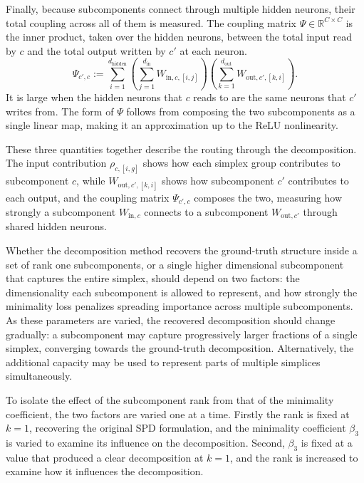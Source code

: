 \documentclass{article}
\begin{document}
Finally, because subcomponents connect through multiple hidden neurons,
their total coupling across all of them is measured. The coupling matrix
$\Psi \in \mathbb{R}^{C \times C}$ is the inner product, taken over the hidden
neurons, between the total input read by $c$ and the total output written by
$c'$ at each neuron.
\begin{equation}
    \Psi_{c',c} := \sum_{i=1}^{d_{\text{hidden}}}
    \left( \sum_{j=1}^{d_{\text{in}}}  W_{\text{in},c,[i,j]}  \right)
    \left( \sum_{k=1}^{d_{\text{out}}} W_{\text{out},c',[k,i]} \right).
\end{equation}
It is large when the hidden neurons that $c$ reads to are the same
neurons that $c'$ writes from. The form of $\Psi$ follows from composing the
two subcomponents as a single linear map, making it an approximation up to the ReLU nonlinearity.

These three quantities together describe the routing through the decomposition. The input
contribution $\rho_{c,[i,g]}$ shows how each simplex group contributes to subcomponent $c$,
while $W_{\text{out},c',[k,i]}$ shows how subcomponent $c'$ contributes to each output,
and the coupling matrix $\Psi_{c',c}$ composes the two, measuring how
strongly a subcomponent $W_{\text{in},c}$ connects to a subcomponent $W_{\text{out},c'}$
through shared hidden neurons.


Whether the decomposition method recovers the 
ground-truth structure inside a set of rank one subcomponents,
or a single higher dimensional subcomponent
that captures the entire simplex,
should depend on two factors: the dimensionality each
subcomponent is allowed to represent, and how strongly
the minimality loss penalizes spreading importance
across multiple subcomponents. As these parameters are
varied, the recovered decomposition should
change gradually: a subcomponent may capture progressively
larger fractions of a single simplex, converging towards
the ground-truth decomposition. Alternatively, the additional
capacity may be used to represent parts of multiple simplices
simultaneously.

To isolate the effect of the subcomponent rank from that of the minimality coefficient,
the two factors are varied one at a time. Firstly the rank is fixed at $k=1$, recovering the
original SPD formulation, and the minimality coefficient $\beta_3$ is varied to examine its
influence on the decomposition. Second, $\beta_3$ is fixed at a value that produced a clear
decomposition at $k=1$, and the rank is increased to examine how it influences
the decomposition.
\end{document}

